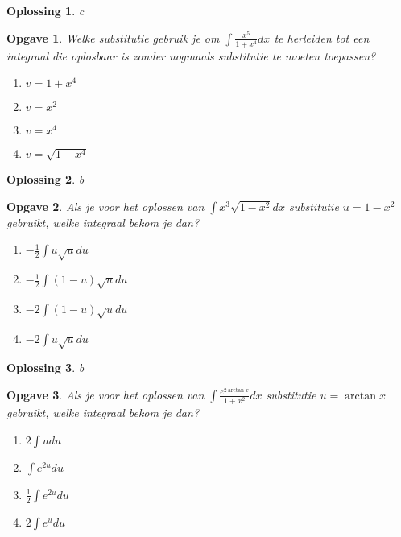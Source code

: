 \documentclass{article}
\newtheorem{opgave}{Opgave}
\newtheorem*{oplossing}{Oplossing}
\begin{document}
\begin{oplossing}
c
\end{oplossing}

\begin{opgave}
Welke substitutie gebruik je om $\int \frac{x^5}{1+x^4}dx$ te herleiden tot een integraal die oplosbaar is zonder nogmaals substitutie te moeten toepassen?

\begin{enumerate}[a]
\item $v=1+x^4$
\item $v=x^2$
\item $v=x^4$
\item $v=\sqrt{1+x^4}$
\end{enumerate}

\end{opgave}

\begin{oplossing}
b
\end{oplossing}

\begin{opgave}
Als je voor het oplossen van $\int x^3\sqrt {1-x^2}dx$ substitutie $u=1-x^2$ gebruikt, welke integraal bekom je dan?

\begin{enumerate}[a]
\item $-\frac{1}{2} \int u \sqrt{u} du$
\item $-\frac{1}{2} \int (1-u)\sqrt{u} du$
\item $-2\int (1-u) \sqrt{u}du$
\item $-2 \int u \sqrt{u}du$
\end{enumerate}
\end{opgave}

\begin{oplossing}
b
\end{oplossing}

\begin{opgave}
Als je voor het oplossen van $\int \frac{e^{2\arctan x}}{1+x^2}dx$ substitutie $u=\arctan x$ gebruikt, welke integraal bekom je dan?

\begin{enumerate}[a]
\item $2 \int udu$
\item $\int e^{2u} du$
\item $\frac{1}{2} \int e^{2u}du$
\item $2 \int e^udu$
\end{enumerate}

\end{opgave}
\end{document}
